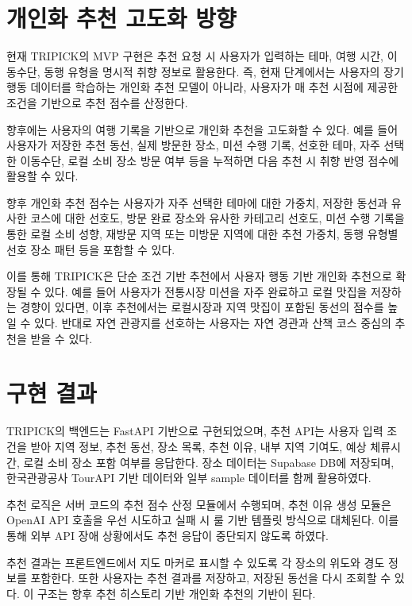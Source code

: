 \documentclass[10pt,a4paper]{article}
\begin{document}
\section{개인화 추천 고도화 방향}

현재 TRIPICK의 MVP 구현은 추천 요청 시 사용자가 입력하는 테마, 여행 시간, 이동수단, 동행 유형을 명시적 취향 정보로 활용한다. 즉, 현재 단계에서는 사용자의 장기 행동 데이터를 학습하는 개인화 추천 모델이 아니라, 사용자가 매 추천 시점에 제공한 조건을 기반으로 추천 점수를 산정한다.

향후에는 사용자의 여행 기록을 기반으로 개인화 추천을 고도화할 수 있다. 예를 들어 사용자가 저장한 추천 동선, 실제 방문한 장소, 미션 수행 기록, 선호한 테마, 자주 선택한 이동수단, 로컬 소비 장소 방문 여부 등을 누적하면 다음 추천 시 취향 반영 점수에 활용할 수 있다.

향후 개인화 추천 점수는 사용자가 자주 선택한 테마에 대한 가중치, 저장한 동선과 유사한 코스에 대한 선호도, 방문 완료 장소와 유사한 카테고리 선호도, 미션 수행 기록을 통한 로컬 소비 성향, 재방문 지역 또는 미방문 지역에 대한 추천 가중치, 동행 유형별 선호 장소 패턴 등을 포함할 수 있다.

이를 통해 TRIPICK은 단순 조건 기반 추천에서 사용자 행동 기반 개인화 추천으로 확장될 수 있다. 예를 들어 사용자가 전통시장 미션을 자주 완료하고 로컬 맛집을 저장하는 경향이 있다면, 이후 추천에서는 로컬시장과 지역 맛집이 포함된 동선의 점수를 높일 수 있다. 반대로 자연 관광지를 선호하는 사용자는 자연 경관과 산책 코스 중심의 추천을 받을 수 있다.

\section{구현 결과}

TRIPICK의 백엔드는 FastAPI 기반으로 구현되었으며, 추천 API는 사용자 입력 조건을 받아 지역 정보, 추천 동선, 장소 목록, 추천 이유, 내부 지역 기여도, 예상 체류시간, 로컬 소비 장소 포함 여부를 응답한다. 장소 데이터는 Supabase DB에 저장되며, 한국관광공사 TourAPI 기반 데이터와 일부 sample 데이터를 함께 활용하였다.

추천 로직은 서버 코드의 추천 점수 산정 모듈에서 수행되며, 추천 이유 생성 모듈은 OpenAI API 호출을 우선 시도하고 실패 시 룰 기반 템플릿 방식으로 대체된다. 이를 통해 외부 API 장애 상황에서도 추천 응답이 중단되지 않도록 하였다.

추천 결과는 프론트엔드에서 지도 마커로 표시할 수 있도록 각 장소의 위도와 경도 정보를 포함한다. 또한 사용자는 추천 결과를 저장하고, 저장된 동선을 다시 조회할 수 있다. 이 구조는 향후 추천 히스토리 기반 개인화 추천의 기반이 된다.
\end{document}
